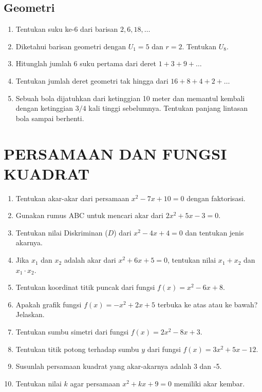 \documentclass[12pt, a4paper]{article}
\begin{document}
\subsection{Geometri}
\begin{enumerate}
    \item Tentukan suku ke-6 dari barisan $2, 6, 18, \dots$
    \item Diketahui barisan geometri dengan $U_1 = 5$ dan $r = 2$. Tentukan $U_8$.
    \item Hitunglah jumlah 6 suku pertama dari deret $1 + 3 + 9 + \dots$
    \item Tentukan jumlah deret geometri tak hingga dari $16 + 8 + 4 + 2 + \dots$
    \item Sebuah bola dijatuhkan dari ketinggian 10 meter dan memantul kembali dengan ketinggian $3/4$ kali tinggi sebelumnya. Tentukan panjang lintasan bola sampai berhenti.
\end{enumerate}

\section{PERSAMAAN DAN FUNGSI KUADRAT}
\begin{enumerate}
    \item Tentukan akar-akar dari persamaan $x^2 - 7x + 10 = 0$ dengan faktorisasi.
    \item Gunakan rumus ABC untuk mencari akar dari $2x^2 + 5x - 3 = 0$.
    \item Tentukan nilai Diskriminan ($D$) dari $x^2 - 4x + 4 = 0$ dan tentukan jenis akarnya.
    \item Jika $x_1$ dan $x_2$ adalah akar dari $x^2 + 6x + 5 = 0$, tentukan nilai $x_1 + x_2$ dan $x_1 \cdot x_2$.
    \item Tentukan koordinat titik puncak dari fungsi $f(x) = x^2 - 6x + 8$.
    \item Apakah grafik fungsi $f(x) = -x^2 + 2x + 5$ terbuka ke atas atau ke bawah? Jelaskan.
    \item Tentukan sumbu simetri dari fungsi $f(x) = 2x^2 - 8x + 3$.
    \item Tentukan titik potong terhadap sumbu $y$ dari fungsi $f(x) = 3x^2 + 5x - 12$.
    \item Susunlah persamaan kuadrat yang akar-akarnya adalah 3 dan -5.
    \item Tentukan nilai $k$ agar persamaan $x^2 + kx + 9 = 0$ memiliki akar kembar.
\end{enumerate}
\end{document}

